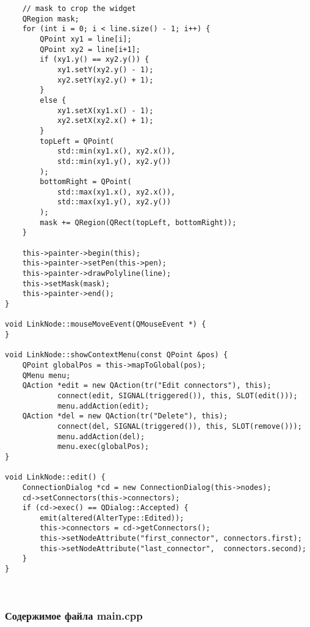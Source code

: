 \begin{lstlisting}
    // mask to crop the widget
    QRegion mask;
    for (int i = 0; i < line.size() - 1; i++) {
        QPoint xy1 = line[i];
        QPoint xy2 = line[i+1];
        if (xy1.y() == xy2.y()) {
            xy1.setY(xy2.y() - 1);
            xy2.setY(xy2.y() + 1);
        }
        else {
            xy1.setX(xy1.x() - 1);
            xy2.setX(xy2.x() + 1);
        }
        topLeft = QPoint(
            std::min(xy1.x(), xy2.x()),
            std::min(xy1.y(), xy2.y())
        );
        bottomRight = QPoint(
            std::max(xy1.x(), xy2.x()),
            std::max(xy1.y(), xy2.y())
        );
        mask += QRegion(QRect(topLeft, bottomRight));
    }

    this->painter->begin(this);
    this->painter->setPen(this->pen);
    this->painter->drawPolyline(line);
    this->setMask(mask);
    this->painter->end();
}

void LinkNode::mouseMoveEvent(QMouseEvent *) {
}

void LinkNode::showContextMenu(const QPoint &pos) {
    QPoint globalPos = this->mapToGlobal(pos);
    QMenu menu;
    QAction *edit = new QAction(tr("Edit connectors"), this);
            connect(edit, SIGNAL(triggered()), this, SLOT(edit()));
            menu.addAction(edit);
    QAction *del = new QAction(tr("Delete"), this);
            connect(del, SIGNAL(triggered()), this, SLOT(remove()));
            menu.addAction(del);
            menu.exec(globalPos);
}

void LinkNode::edit() {
    ConnectionDialog *cd = new ConnectionDialog(this->nodes);
    cd->setConnectors(this->connectors);
    if (cd->exec() == QDialog::Accepted) {
        emit(altered(AlterType::Edited));
        this->connectors = cd->getConnectors();
        this->setNodeAttribute("first_connector", connectors.first);
        this->setNodeAttribute("last_connector",  connectors.second);
    }
}
\end{lstlisting}~\\

\subsubsection*{Содержимое файла main.cpp}

